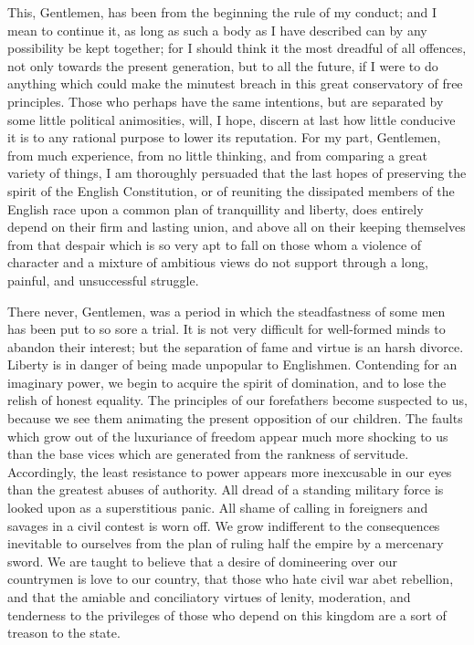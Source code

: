 This, Gentlemen, has been from the beginning the rule of my conduct; and I mean to continue it, as long as such a body as I have described can by any possibility be kept together; for I should think it the most dreadful of all offences, not only towards the present generation, but to all the future, if I were to do anything which could make the minutest breach in this great conservatory of free principles. Those who perhaps have the same intentions, but are separated by some little political animosities, will, I hope, discern at last how little conducive it is to any rational purpose to lower its reputation. For my part, Gentlemen, from much experience, from no little thinking, and from comparing a great variety of things, I am thoroughly persuaded that the last hopes of preserving the spirit of the English Constitution, or of reuniting the dissipated members of the English race upon a common plan of tranquillity and liberty, does entirely depend on their firm and lasting union, and above all on their keeping themselves from that despair which is so very apt to fall on those whom a violence of character and a mixture of ambitious views do not support through a long, painful, and unsuccessful struggle.

There never, Gentlemen, was a period in which the steadfastness of some men has been put to so sore a trial. It is not very difficult for well-formed minds to abandon their interest; but the separation of fame and virtue is an harsh divorce. Liberty is in danger of being made unpopular to Englishmen. Contending for an imaginary power, we begin to acquire the spirit of domination, and to lose the relish of honest equality. The principles of our forefathers become suspected to us, because we see them animating the present opposition of our children. The faults which grow out of the luxuriance of freedom appear much more shocking to us than the base vices which are generated from the rankness of servitude. Accordingly, the least resistance to power appears more inexcusable in our eyes than the greatest abuses of authority. All dread of a standing military force is looked upon as a superstitious panic. All shame of calling in foreigners and savages in a civil contest is worn off. We grow indifferent to the consequences inevitable to ourselves from the plan of ruling half the empire by a mercenary sword. We are taught to believe that a desire of domineering over our countrymen is love to our country, that those who hate civil war abet rebellion, and that the amiable and conciliatory virtues of lenity, moderation, and tenderness to the privileges of those who depend on this kingdom are a sort of treason to the state.

